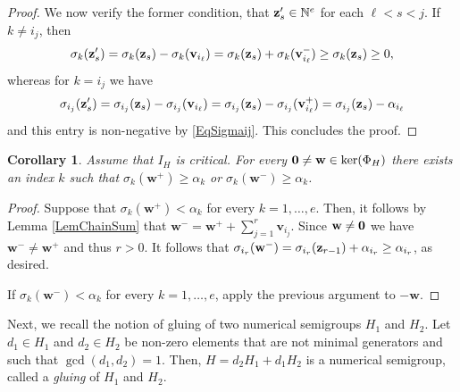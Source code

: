 \documentclass[11pt,twoside]{amsart}
\newcommand{\N}{\mathbb N}
\def\bv{{\mathbf v}}
\def\bw{{\mathbf w}}
\newtheorem{cor}[Theorem]{Corollary}
\theoremstyle{definition}
\numberwithin{equation}{section}
\begin{document}
\begin{proof}
We now verify the former condition, that ${\bf z}'_{s} \in \N^e$ for each $\ell <s<j$.
If $k \ne i_j$, then 
$$
\sigma_k({\bf z}'_{s}) = \sigma_k({\bf z}_{s})-\sigma_k({\bf v}_{i_\ell})
= \sigma_k({\bf z}_{s})+\sigma_k({\bf v}^-_{i_\ell}) \geq  \sigma_k({\bf z}_{s}) \geq 0,
$$ 
 whereas for $k = i_j$ we have
$$
\sigma_{i_j}({\bf z}'_{s}) = \sigma_{i_j}({\bf z}_{s})-\sigma_{i_j}({\bf v}_{i_\ell})
= \sigma_{i_j}({\bf z}_{s})-\sigma_{i_j}({\bf v}^+_{i_\ell}) 
= \sigma_{i_j}({\bf z}_{s})-\alpha_{i_\ell}
$$ 
and this entry is non-negative by \eqref{EqSigmaij}.
This concludes the proof.
\end{proof}


\begin{cor}\label{ideal membership}
Assume that  $I_H$ is critical.
For every ${\bf 0}\ne\bw \in \ker(\Phi_H)$ there exists an index $k$ such that  $\sigma_k(\bw^+) \ge \alpha_k$ or $\sigma_k(\bw^-) \ge \alpha_k$. 
\end{cor}

\begin{proof}
Suppose that  $\sigma_k(\bw^+) < \alpha_k$ for every $k=1,\ldots,e$. 
Then, it follows by Lemma \ref{LemChainSum} 
that $\bw^- = \bw^+ + \sum_{j=1}^r\bv_{i_j}$.
Since $\bw \ne {\bf 0}$ we have $\bw^- \ne \bw^+$ and thus $r>0$.
It follows that $\sigma_{i_r}(\bw^-)=\sigma_{i_r}({\bf z}_{r-1})+\alpha_{i_r} \ge \alpha_{i_r}$, as desired.

If  $\sigma_k(\bw^-) < \alpha_k$ for every $k=1,\ldots,e$, apply the previous argument to $-\bw$.
\end{proof}



Next, we recall the notion of gluing of two numerical semigroups
$H_1$ and $H_2$.
Let $d_1 \in H_1$ and 
$d_2 \in H_2$ be non-zero elements that are not minimal generators and such that $\gcd(d_1,d_2) = 1$.
Then,  $H = d_2H_1 + d_1H_2$ is a numerical semigroup, 
  called a \emph{gluing} of $H_1$ and $H_2$. 
\end{document}
